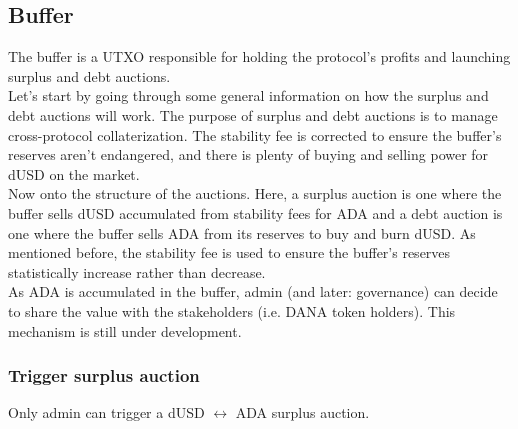 \documentclass{article} %
\begin{document}
\subsection{Buffer}

The buffer is a UTXO responsible for holding the protocol's profits and launching 
surplus and debt auctions. \\

Let's start by going through some general information on how the surplus and
debt auctions will work.
%
The purpose of surplus and debt auctions is to manage cross-protocol collaterization. The stability fee is corrected to ensure the buffer's
reserves aren't endangered, and there is plenty of buying and selling power for
dUSD on the market. \\

Now onto the structure of the auctions.
%
Here, a surplus auction is one where the buffer sells dUSD accumulated from stability fees for ADA
and a debt auction is one where the buffer sells ADA from its reserves to buy and burn dUSD.
As mentioned before, the stability fee is used to ensure the buffer's reserves statistically increase rather
than decrease. \\

As ADA is accumulated in the buffer, admin (and later: governance) can decide to
share the value with the stakeholders (i.e. DANA token holders).
This mechanism is still under development. \\

\subsubsection{Trigger surplus auction}

Only admin can trigger a dUSD $\leftrightarrow$ ADA surplus auction.

%
\end{document}
